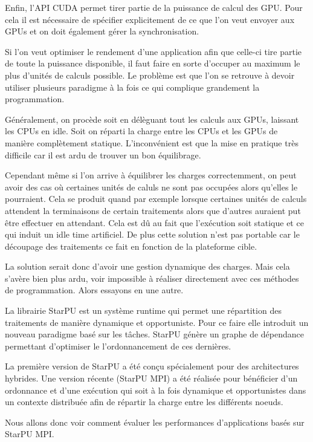 \documentclass[smallextended]{svjour3}
\begin{document}
Enfin, l'API CUDA permet tirer partie de la puissance de calcul
des GPU. Pour cela il est nécessaire de spécifier explicitement de
ce que l'on veut envoyer aux GPUs et on doit également gérer la
synchronisation.  

Si l'on veut optimiser le rendement d'une application afin que
celle-ci tire partie de toute la puissance disponible, il faut faire
en sorte d'occuper au maximum le plus d'unités de calculs possible.  
Le problème est que l'on se retrouve à devoir utiliser plusieurs
paradigme à la fois ce qui complique grandement la programmation.

Généralement, on procède soit en délèguant tout les calculs aux
GPUs, laissant les CPUs en idle. Soit on réparti la charge entre les
CPUs et les GPUs de manière complètement statique. L'inconvénient
est que la mise en pratique très difficile car il est ardu de
trouver un bon équilibrage.

Cependant même si l'on arrive à équilibrer les charges
correctemment, on peut avoir des cas où certaines unités de
caluls ne sont pas occupées alors qu'elles le pourraient. Cela se
produit quand par exemple lorsque certaines unités de calculs
attendent la terminaisons de certain traitements alors que
d'autres auraient put être effectuer en attendant. Cela est dû au
fait que l'exécution soit statique et ce qui induit un idle time
artificiel. De plus cette solution n'est pas portable car le
découpage des traitements ce fait en fonction de la plateforme
cible.

La solution serait donc d'avoir une gestion dynamique des
charges. Mais cela s'avère bien plus ardu, voir impossible
à réaliser directement avec ces méthodes de programmation. Alors
essayons en une autre.

La librairie StarPU est un système runtime qui permet une
répartition des traitements de manière dynamique et opportuniste. 
Pour ce faire elle introduit un nouveau paradigme basé sur les
tâches. StarPU génère un graphe de dépendance permettant
d'optimiser le l'ordonnancement de ces dernières.

La première version de StarPU a été conçu spécialement pour des
architectures hybrides. Une version récente (StarPU MPI) a été
réalisée pour bénéficier d'un ordonnance et d'une exécution qui
soit à la fois dynamique et opportunistes dans un contexte
distribuée afin de répartir la charge entre les différents
noeuds.

Nous allons donc voir comment évaluer les performances
d'applications basés sur StarPU MPI.
\end{document}
